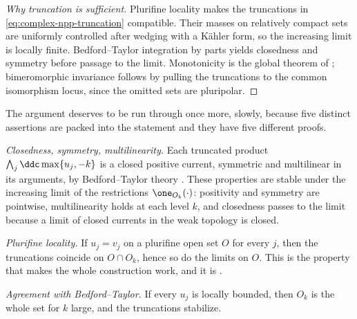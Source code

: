 \begin{proof}[Why truncation is sufficient]
Plurifine locality makes the truncations in
\eqref{eq:complex-npp-truncation} compatible.  Their masses on relatively
compact sets are uniformly controlled after wedging with a K\"ahler
form, so the increasing limit is locally finite.  Bedford--Taylor
integration by parts yields closedness and symmetry before passage to
the limit.  Monotonicity is the global theorem of
\cite{BEGZ10}; bimeromorphic invariance follows by pulling the
truncations to the common isomorphism locus, since the omitted sets are
pluripolar.
\end{proof}

The argument deserves to be run through once more, slowly, because five
distinct assertions are packed into the statement and they have five
different proofs.

\emph{Closedness, symmetry, multilinearity.}  Each truncated product
\(\bigwedge_j\ddc\max\{u_j,-k\}\) is a closed positive current, symmetric
and multilinear in its arguments, by Bedford--Taylor theory
\cite{BT76,BT82}.  These properties are stable under the increasing limit
of the restrictions \(\one_{O_k}(\cdot)\): positivity and symmetry are
pointwise, multilinearity holds at each level \(k\), and closedness
passes to the limit because a limit of closed currents in the weak
topology is closed.

\emph{Plurifine locality.}  If \(u_j=v_j\) on a plurifine open set \(O\)
for every \(j\), then the truncations coincide on
\(O\cap O_k\), hence so do the limits on \(O\).  This is the property that
makes the whole construction work, and it is
\cite{BT87}.

\emph{Agreement with Bedford--Taylor.}  If every \(u_j\) is locally
bounded, then \(O_k\) is the whole set for \(k\) large, and the
truncations stabilize.

